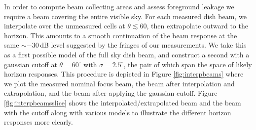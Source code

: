 \documentclass{emulateapj}
\begin{document}



In order to compute beam collecting areas and assess foreground leakage we require a beam covering the entire visible sky. For each measured dish beam, we interpolate over the unmeasured cells at $\theta\lesssim60$, then extrapolate outward to the horizon. This amounts to a smooth continuation of the beam response at the same $\sim-30$\,dB level suggested by the fringes of our measurements. We take this as a first possible model of the full sky dish beam, and construct a second with a gaussian cutoff at $\theta=60^\circ$ with $\sigma=2.5^\circ$, the pair of which span the space of likely horizon responses. This procedure is depicted in Figure \ref{fig:interpbeams} where we plot the measured nominal focus beam, the beam after interpolation and extrapolation, and the beam after applying the gaussian cutoff. Figure \ref{fig:interpbeamsslice} shows the interpolated/extrapolated beam and the beam with the cutoff along with various models to illustrate the different horizon responses more clearly.

\end{document}

